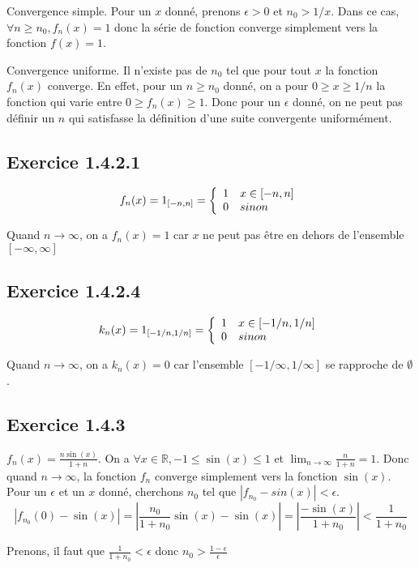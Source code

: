 \documentclass[]{book}
\theoremstyle{definition}
\newcommand{\bb}[1]{\mathbb{#1}}
\newcommand{\R}{\bb{R}}
\begin{document}
Convergence simple. Pour un $x$ donn\'e, prenons  $\epsilon > 0$ et $n_0 > 1/x$. Dans ce cas, $\forall n \geq n_0, f_n(x) = 1$ donc la s\'erie de fonction converge simplement vers la fonction $f(x) = 1$.

Convergence uniforme. Il n'existe pas de $n_0$ tel que pour tout $x$ la fonction $f_n(x)$ converge. En effet, pour un $n \geq n_0$ donn\'e, on a pour $0 \geq x \geq 1/n$ la fonction qui varie entre $0 \geq f_n(x) \geq 1$. Donc pour un $\epsilon$ donn\'e, on ne peut pas d\'efinir un $n$ qui satisfasse la d\'efinition d'une suite convergente uniform\'ement.   

\subsection*{Exercice 1.4.2.1}
$$
f_n(x) = 1_{[-n, n]} = 
\left\{
\begin{array}{l l}
1 & x \in [-n,n] \\
0 & sinon
\end{array}
\right.
$$

Quand $n \to \infty$, on a $f_n(x) = 1$ car $x$ ne peut pas \^etre en dehors de l'ensemble $[-\infty, \infty]$


\subsection*{Exercice 1.4.2.4}
$$
k_n(x) = 1_{[-1/n, 1/n]} = 
\left\{
\begin{array}{l l}
1 & x \in [-1/n,1/n] \\
0 & sinon
\end{array}
\right.
$$

Quand $n \to \infty$, on a $k_n(x) = 0$ car l'ensemble $[-1/\infty, 1/\infty]$ se rapproche de $\emptyset$.

\subsection*{Exercice 1.4.3}
$f_n(x) = \frac{n \sin(x)}{1+n}$. On a $\forall x \in \R, -1 \leq \sin(x) \leq 1$ et $\lim_{n \to \infty} {\frac{n}{1+n}} = 1$. Donc quand $n \to \infty$, la fonction $f_n$ converge simplement vers la fonction $\sin(x)$. Pour un $\epsilon$ et un $x$ donn\'e, cherchons $n_0$ tel que $|f_{n_0}-sin(x)|<\epsilon$. 
$$
|f_{n_0}(0)-\sin(x)| = \left|\frac{n_0}{1+n_0}\sin(x)-\sin(x)\right| = \left|\frac{-\sin(x)}{1+n_0}\right| < \frac{1}{1+n_0}
$$

Prenons, il faut que $\frac{1}{1+n_0} < \epsilon$ donc $n_0 > \frac{1-\epsilon}{\epsilon}$
\end{document}
